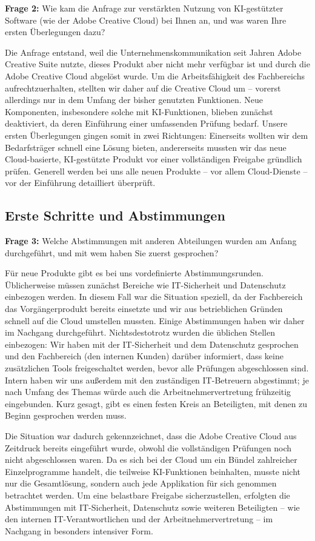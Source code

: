 \documentclass[
    12pt, 
    a4paper,
    ]{scrartcl} %
\begin{document}
\textbf{Frage 2:} Wie kam die Anfrage zur verstärkten Nutzung von KI-gestützter Software (wie der Adobe Creative Cloud) bei Ihnen an, und was waren Ihre ersten Überlegungen dazu?  

Die Anfrage entstand, weil die Unternehmenskommunikation seit Jahren Adobe Creative Suite nutzte, dieses Produkt aber nicht mehr verfügbar ist und durch die Adobe Creative Cloud abgelöst wurde. Um die Arbeitsfähigkeit des Fachbereichs aufrechtzuerhalten, stellten wir daher auf die Creative Cloud um – vorerst allerdings nur in dem Umfang der bisher genutzten Funktionen. Neue Komponenten, insbesondere solche mit KI-Funktionen, blieben zunächst deaktiviert, da deren Einführung einer umfassenden Prüfung bedarf. Unsere ersten Überlegungen gingen somit in zwei Richtungen: Einerseits wollten wir dem Bedarfsträger schnell eine Lösung bieten, andererseits mussten wir das neue Cloud-basierte, KI-gestützte Produkt vor einer vollständigen Freigabe gründlich prüfen. Generell werden bei uns alle neuen Produkte – vor allem Cloud-Dienste – vor der Einführung detailliert überprüft.  

\subsection*{Erste Schritte und Abstimmungen}

\textbf{Frage 3:} Welche Abstimmungen mit anderen Abteilungen wurden am Anfang durchgeführt, und mit wem haben Sie zuerst gesprochen?  

Für neue Produkte gibt es bei uns vordefinierte Abstimmungsrunden. Üblicherweise müssen zunächst Bereiche wie IT-Sicherheit und Datenschutz einbezogen werden. In diesem Fall war die Situation speziell, da der Fachbereich das Vorgängerprodukt bereits einsetzte und wir aus betrieblichen Gründen schnell auf die Cloud umstellen mussten. Einige Abstimmungen haben wir daher im Nachgang durchgeführt. Nichtsdestotrotz wurden die üblichen Stellen einbezogen: Wir haben mit der IT-Sicherheit und dem Datenschutz gesprochen und den Fachbereich (den internen Kunden) darüber informiert, dass keine zusätzlichen Tools freigeschaltet werden, bevor alle Prüfungen abgeschlossen sind. Intern haben wir uns außerdem mit den zuständigen IT-Betreuern abgestimmt; je nach Umfang des Themas würde auch die Arbeitnehmervertretung frühzeitig eingebunden. Kurz gesagt, gibt es einen festen Kreis an Beteiligten, mit denen zu Beginn gesprochen werden muss.  

Die Situation war dadurch gekennzeichnet, dass die Adobe Creative Cloud aus Zeitdruck bereits eingeführt wurde, obwohl die vollständigen Prüfungen noch nicht abgeschlossen waren. Da es sich bei der Cloud um ein Bündel zahlreicher Einzelprogramme handelt, die teilweise KI-Funktionen beinhalten, musste nicht nur die Gesamtlösung, sondern auch jede Applikation für sich genommen betrachtet werden. Um eine belastbare Freigabe sicherzustellen, erfolgten die Abstimmungen mit IT-Sicherheit, Datenschutz sowie weiteren Beteiligten – wie den internen IT-Verantwortlichen und der Arbeitnehmervertretung – im Nachgang in besonders intensiver Form.
\end{document}
